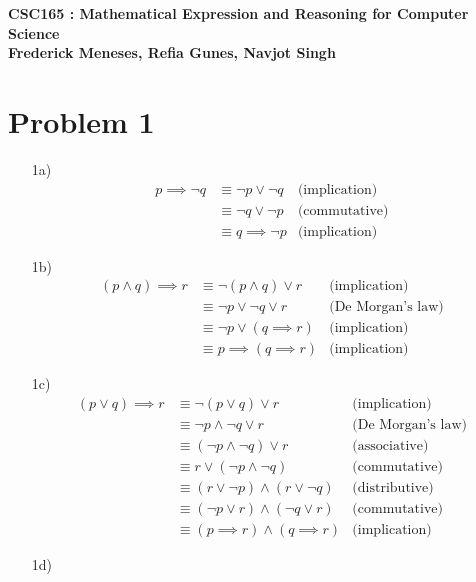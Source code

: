 \documentclass[12pt]{exam}
\begin{document}
{\large 
    \begin{center}
        {\bf CSC165 : Mathematical Expression and Reasoning for Computer Science}\\
        {\bf Frederick Meneses, Refia Gunes, Navjot Singh}
    \end{center}
}

\section{Problem 1}
\begin{itemize}
    \item[1a)] 
    \begin{align*}
        p \implies \lnot q &\equiv \lnot p \lor \lnot q &\text{(implication)}\\
        &\equiv \lnot q \lor \lnot p  &\text{(commutative)}\\
        &\equiv q \implies \lnot p &\text{(implication)}
    \end{align*}
    \item[1b)] 
    \begin{align*}
        (p \land q) \implies r &\equiv \lnot(p \land q) \lor r &\text{(implication)} \\
        &\equiv \lnot p \lor \lnot q \lor r &\text{(De Morgan's law)} \\
        &\equiv \lnot p \lor (q \implies r) &\text{(implication)} \\
        &\equiv p \implies (q \implies r) &\text{(implication)}
    \end{align*}
    \item[1c)]
    \begin{align*}
        (p \lor q) \implies r &\equiv \lnot (p \lor q) \lor r &\text{(implication)}
        \\ &\equiv \lnot p \land \lnot q \lor r &\text{(De Morgan's law)}
        \\ &\equiv (\lnot p \land \lnot q) \lor r &\text{(associative)}
        \\ &\equiv r \lor (\lnot p \land \lnot q) &\text{(commutative)}
        \\ &\equiv (r \lor \lnot p) \land (r \lor \lnot q) &\text{(distributive)}
        \\ &\equiv (\lnot p \lor r) \land (\lnot q \lor r) &\text{(commutative)}
        \\ &\equiv (p \implies r) \land (q \implies r) &\text{(implication)}
        \end{align*}
    \item[1d)]

\end{itemize}
\end{document}
